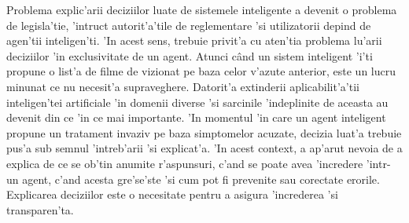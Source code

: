 \documentclass[12pt,a4paper,twoside]{report}
\begin{document}
Problema explic'arii deciziilor luate de sistemele inteligente a devenit o problema de legisla'tie, 'intruc\ia t autorit'a'tile de reglementare 'si utilizatorii depind de agen'tii inteligen'ti. 'In acest sens, trebuie privit'a cu aten'tia problema lu'arii deciziilor 'in exclusivitate de un agent. Atunci c\^and un sistem inteligent 'i'ti propune o list'a de filme de vizionat pe baza celor v'azute anterior, este un lucru minunat ce nu necesit'a supraveghere. Datorit'a extinderii aplicabilit'a'tii inteligen'tei artificiale 'in domenii diverse 'si sarcinile 'indeplinite de aceasta au devenit din ce 'in ce mai importante. 'In momentul 'in care un agent inteligent propune un tratament invaziv pe baza simptomelor acuzate, decizia luat'a trebuie pus'a sub semnul 'intreb'arii 'si explicat'a. 'In acest context, a ap'arut nevoia de a explica de ce se ob'tin anumite r'aspunsuri, c'and se poate avea 'incredere 'intr-un agent, c'and acesta gre'se'ste 'si cum pot fi prevenite sau corectate erorile. Explicarea deciziilor este o necesitate pentru a asigura 'increderea 'si transparen'ta.
\end{document}

